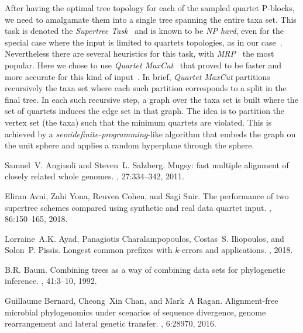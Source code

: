 \documentclass[review]{elsarticle}
\begin{document}
{After having the optimal tree topology for each of the sampled quartet P-blocks, we need to amalgamate  them into a single tree spanning the entire taxa set. This task is denoted the {\em Supertree Task}~\cite{bininda-book-2004}
and is known to be {\em NP hard}, even for the special case where the input 
is limited to 
quartets topologies, as in our case~\cite{NPsteel}. Nevertheless there are several heuristics
for this task, with {\em MRP}~\cite{Baum1992,Ragan1992} the most popular. Here we chose to use {\em Quartet MaxCut}~\cite{sni:rao:10,sni:rao:12}
that proved to be faster and more accurate for this kind of input~\cite{Avni-JME-2018}. In brief, {\em Quartet MaxCut} partitions recursively the taxa set where
each such partition corresponds to a split in the final tree. In each
such recursive step, a graph over the taxa set is built where the set
of quartets induces the edge set in that graph. The idea is to
partition the vertex set (the taxa) such that the minimum quartets are
violated. This is achieved by a {\em semidefinite-programming}-like
algorithm that embeds the graph on the unit sphere and applies a
random hyperplane through the sphere.





\begin{thebibliography}{10}

Samuel~V. Angiuoli and Steven~L. Salzberg.
\newblock Mugsy: fast multiple alignment of closely related whole genomes.
, 27:334--342, 2011.

Eliran Avni, Zahi Yona, Reuven Cohen, and Sagi Snir.
\newblock The performance of two supertree schemes compared using synthetic and
  real data quartet input.
, 86:150--165, 2018.

Lorraine~A.K. Ayad, Panagiotis Charalampopoulos, Costas~S. Iliopoulos, and
  Solon~P. Pissis.
\newblock Longest common prefixes with $k$-errors and applications.
, 2018.

B.R. Baum.
\newblock Combining trees as a way of combining data sets for phylogenetic
  inference.
, 41:3--10, 1992.

Guillaume Bernard, Cheong~Xin Chan, and Mark~A Ragan.
\newblock Alignment-free microbial phylogenomics under scenarios of sequence
  divergence, genome rearrangement and lateral genetic transfer.
, 6:28970, 2016.


\end{thebibliography}}
\end{document}
